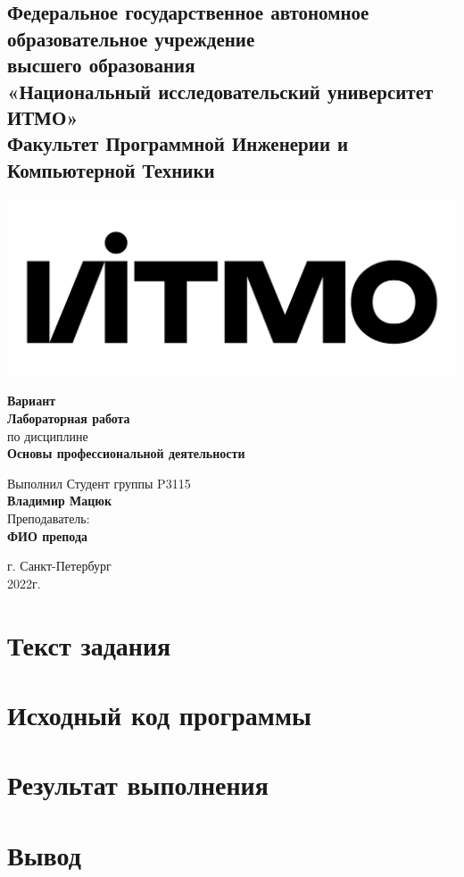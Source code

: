 \documentclass{article}
\begin{document}
\begin{center}
  \section*{
    Федеральное государственное автономное образовательное учреждение\\ высшего образования\\
    «Национальный исследовательский университет ИТМО»\\
    Факультет Программной Инженерии и Компьютерной Техники \\
   }
  \includegraphics[scale=0.2]{../../img/itmo.png}
\end{center}
\vspace{4cm}


\begin{center}
  \large \textbf{Вариант }\\
  \textbf{Лабораторная работа }\\
  по дисциплине\\
  \textbf{Основы профессиональной деятельности}
\end{center}

\vspace*{\fill}

\begin{flushright}
  Выполнил Студент группы P3115\\
  \textbf{Владимир Мацюк}\\
  Преподаватель: \\
  \textbf{ФИО препода}\\
\end{flushright}

\vspace{1cm}

\begin{center}
  г. Санкт-Петербург\\
  2022г.
\end{center}

\newpage
\section{Текст задания}

\section{Исходный код программы}

\lstset{
  language=bash,
  breaklines=true,
  extendedchars=false,
  showspaces=false,
  showstringspaces=false
}


\section{Результат выполнения}

\section{Вывод}
\end{document}
